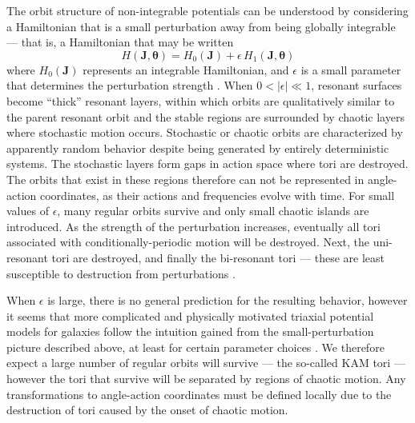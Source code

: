 \documentclass[letterpaper,12pt,preprint]{aastex}
\newcommand{\bs}[1]{\boldsymbol{#1}}
\begin{document}
The orbit structure of non-integrable potentials can be understood by considering a Hamiltonian that is a small perturbation away from being globally integrable --- that is, a Hamiltonian that may be written
\begin{equation}
	H(\boldsymbol{J}, \boldsymbol{\theta}) = H_0(\boldsymbol{J}) + \epsilon \, H_1(\boldsymbol{J}, \boldsymbol{\theta})
\end{equation}
where $H_0(\bs{J})$ represents an integrable Hamiltonian, and $\epsilon$ is a small parameter that determines the perturbation strength \citep[a complete description of perturbation theory applied to nonlinear Hamiltonians is given in][]{lichtenberg83}. When $0 < |\epsilon| \ll 1$, resonant surfaces become ``thick'' resonant layers, within which orbits are qualitatively similar to the parent resonant orbit \citep[e.g.,][]{merritt99} and the stable regions are surrounded by chaotic layers where stochastic motion occurs. Stochastic or chaotic orbits are characterized by apparently random behavior despite being generated by entirely deterministic systems. The stochastic layers form gaps in action space where tori are destroyed. The orbits that exist in these regions therefore can not be represented in angle-action coordinates, as their actions and frequencies evolve with time. For small values of $\epsilon$, many regular orbits survive and only small chaotic islands are introduced. As the strength of the perturbation increases, eventually all tori associated with conditionally-periodic motion will be destroyed. Next, the uni-resonant tori are destroyed, and finally the bi-resonant tori --- these are least susceptible to destruction from perturbations \citep[e.g., see][]{valluri98}.

When $\epsilon$ is large, there is no general prediction for the resulting behavior, however it seems that more complicated and physically motivated triaxial potential models for galaxies follow the intuition gained from the small-perturbation picture described above, at least for certain parameter choices \citep{valluri, merritt, dehnen, etc.}. We therefore expect a large number of regular orbits will survive --- the so-called KAM tori \citep{} --- however the tori that survive will be separated by regions of chaotic motion. Any transformations to angle-action coordinates must be defined locally due to the destruction of tori caused by the onset of chaotic motion. 
%
\end{document}
